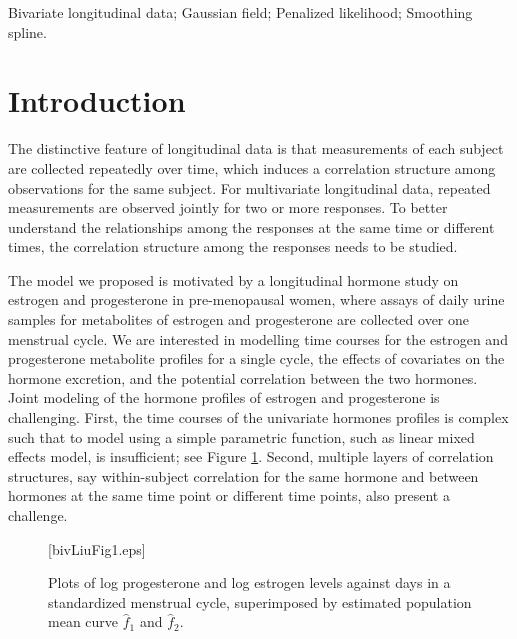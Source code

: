 \documentclass[article,lineno]{biometrika}
\begin{document}
\begin{keywords}
Bivariate longitudinal data; Gaussian field; Penalized likelihood; Smoothing spline.
\end{keywords}

\section{Introduction}

The distinctive feature of longitudinal data is that measurements of each subject are collected repeatedly over time, which induces a correlation structure among observations for the same subject. 
For multivariate longitudinal data, repeated measurements are observed jointly for two or more responses. To better understand the relationships among the responses at the same time or different times, the correlation structure among the responses needs to be studied. 


The model we proposed is motivated by a longitudinal hormone study on estrogen and progesterone in pre-menopausal women, where assays of daily urine samples for metabolites of estrogen and progesterone are collected over one menstrual cycle. 
We are interested in modelling  time courses for the estrogen and progesterone metabolite profiles for a single cycle, the effects of covariates on the hormone excretion, and the potential correlation between the two hormones.  
Joint modeling of the hormone profiles of estrogen and progesterone is challenging.
First, the time courses of the univariate hormones profiles is complex such that
to model using a simple parametric function, such as linear mixed effects model, is insufficient; see Figure \ref{Liu1}. 
Second, multiple layers of correlation structures, say within-subject correlation for the same hormone and between hormones at the same time point or different time points, also present a challenge.


\begin{figure}
\figurebox{20pc}{25pc}{}[bivLiuFig1.eps]
\caption{Plots of log progesterone  and log estrogen levels against days in a standardized menstrual cycle, superimposed by estimated population mean curve $\hat f_1$ and $\hat f_2$.}
\label{Liu1}
\end{figure}
\end{document}
